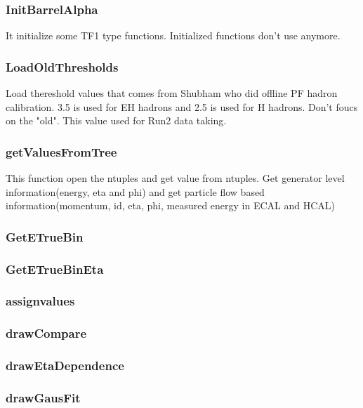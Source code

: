 \documentclass{cernrep}
\begin{document}
\subsubsection{InitBarrelAlpha}

It initialize some TF1 type functions. Initialized functions don't use anymore.

\subsubsection {LoadOldThresholds}

Load thereshold values that comes from Shubham who did offline PF hadron calibration. 3.5 is used for EH hadrons and 2.5 is used for H hadrons. Don't foucs on the "old". This value used for Run2 data taking.

\subsubsection {getValuesFromTree}
This function open the ntuples and get value from ntuples. Get generator level information(energy, eta and phi) and get particle flow based information(momentum, id, eta, phi, measured energy in ECAL and HCAL)


\subsubsection {GetETrueBin}


\subsubsection {GetETrueBinEta}


\subsubsection {assignvalues}


\subsubsection {drawCompare}


\subsubsection {drawEtaDependence}


\subsubsection {drawGausFit}
\end{document}
